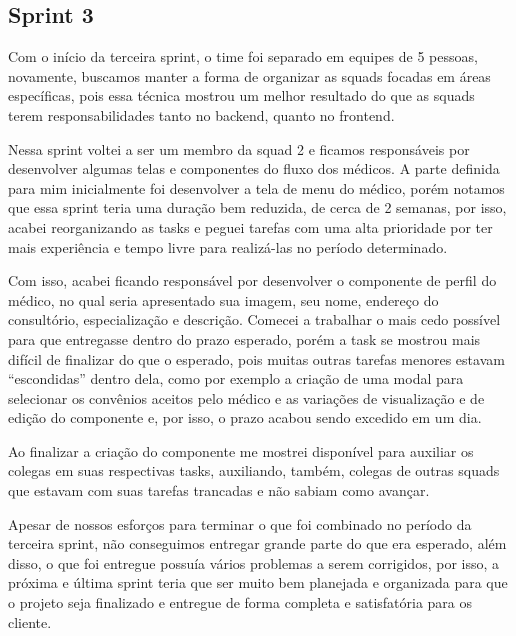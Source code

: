\subsection{Sprint 3}

Com o início da terceira sprint, o time foi separado em equipes de 5 pessoas, novamente, buscamos manter a forma de organizar as squads focadas em áreas específicas, pois essa técnica mostrou um melhor resultado do que as squads terem responsabilidades tanto no backend, quanto no frontend.

Nessa sprint voltei a ser um membro da squad 2 e ficamos responsáveis por desenvolver algumas telas e componentes do fluxo dos médicos. A parte definida para mim inicialmente foi desenvolver a tela de menu do médico, porém notamos que essa sprint teria uma duração bem reduzida, de cerca de 2 semanas, por isso, acabei reorganizando as tasks e peguei tarefas com uma alta prioridade por ter mais experiência e tempo livre para realizá-las no período determinado. 

Com isso, acabei ficando responsável por desenvolver o componente de perfil do médico, no qual seria apresentado sua imagem, seu nome, endereço do consultório, especialização e descrição. Comecei a trabalhar o mais cedo possível para que entregasse dentro do prazo esperado, porém a task se mostrou mais difícil de finalizar do que o esperado, pois muitas outras tarefas menores estavam “escondidas” dentro dela, como por exemplo a criação de uma modal para selecionar os convênios aceitos pelo médico e as variações de visualização e de edição do componente e, por isso, o prazo acabou sendo excedido em um dia.

Ao finalizar a criação do componente me mostrei disponível para auxiliar os colegas em suas respectivas tasks, auxiliando, também, colegas de outras squads que estavam com suas tarefas trancadas e não sabiam como avançar.

Apesar de nossos esforços para terminar o que foi combinado no período da terceira sprint, não conseguimos entregar grande parte do que era esperado, além disso, o que foi entregue possuía vários problemas a serem corrigidos, por isso, a próxima e última sprint teria que ser muito bem planejada e organizada para que o projeto seja finalizado e entregue de forma completa e satisfatória para os cliente.
